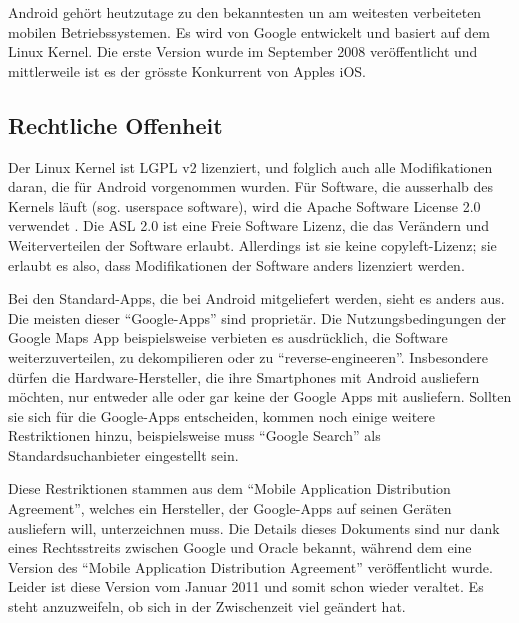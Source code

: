 Android gehört heutzutage zu den bekanntesten un am weitesten verbeiteten mobilen Betriebssystemen. Es wird von Google entwickelt und basiert auf dem Linux Kernel. Die erste Version wurde im September 2008 veröffentlicht und mittlerweile ist es der grösste Konkurrent von Apples iOS. \\

\subsection{Rechtliche Offenheit}
Der Linux Kernel ist LGPL v2 lizenziert\cite{online:kernel-license}, und folglich auch alle Modifikationen daran, die für Android vorgenommen wurden. Für Software, die ausserhalb des Kernels läuft (sog. userspace software), wird die Apache Software License 2.0 verwendet \cite{online:android-licenses}. Die ASL 2.0 ist eine Freie Software Lizenz, die das Verändern und Weiterverteilen der Software erlaubt. Allerdings ist sie  keine copyleft-Lizenz; sie erlaubt es also, dass Modifikationen der Software anders lizenziert werden\cite{online:apache-license}.

Bei den Standard-Apps, die bei Android mitgeliefert werden, sieht es anders aus. Die meisten dieser ``Google-Apps'' sind proprietär. Die Nutzungsbedingungen der Google Maps App beispielsweise verbieten es ausdrücklich, die Software weiterzuverteilen, zu dekompilieren oder zu ``reverse-engineeren''\cite{online:google-maps-tos}. Insbesondere dürfen die Hardware-Hersteller, die ihre Smartphones mit Android ausliefern möchten, nur entweder alle oder gar keine der Google Apps mit ausliefern. Sollten sie sich für die Google-Apps entscheiden, kommen noch einige weitere Restriktionen hinzu, beispielsweise muss ``Google Search'' als Standardsuchanbieter eingestellt sein\cite{online:mada-leak}.

Diese Restriktionen stammen aus dem ``Mobile Application Distribution Agreement'', welches ein Hersteller, der Google-Apps auf seinen Geräten ausliefern will, unterzeichnen muss. Die Details dieses Dokuments sind nur dank eines Rechtsstreits zwischen Google und Oracle bekannt, während dem eine Version des ``Mobile Application Distribution Agreement'' veröffentlicht wurde\cite{online:ars-mada-leak}. Leider ist diese Version vom Januar 2011 und somit schon wieder veraltet. Es steht anzuzweifeln, ob sich in der Zwischenzeit viel geändert hat. \\

